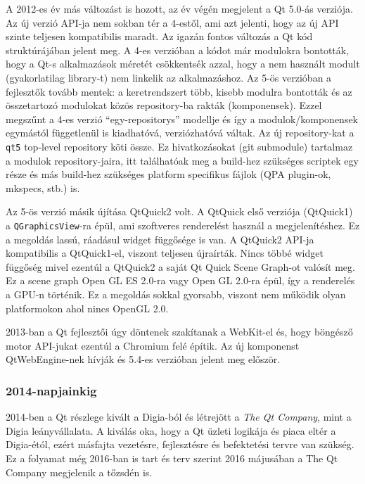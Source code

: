 \documentclass[12pt]{report}
\begin{document}
A 2012-es év más változást is hozott, az év végén megjelent a Qt 5.0-ás verziója.
Az új verzió API-ja nem sokban tér a 4-estől, ami azt jelenti, hogy az új API szinte
teljesen kompatibilis maradt. Az igazán fontos változás a Qt kód struktúrájában jelent meg.
A 4-es verzióban a kódot már modulokra bontották, hogy a Qt-s alkalmazások méretét
csökkentsék azzal, hogy a nem használt modult (gyakorlatilag library-t) nem linkelik
az alkalmazáshoz. Az 5-ös verzióban a fejlesztők tovább mentek: a keretrendszert több,
kisebb modulra bontották és az összetartozó modulokat közös repository-ba rakták
(komponensek). Ezzel megszűnt a 4-es verzió ``egy-repositorys'' modellje és így a
modulok/komponensek egymástól függetlenül is kiadhatóvá, verziózhatóvá váltak.
Az új repository-kat a \texttt{qt5} top-level repository köti össze.
Ez hivatkozásokat (git submodule) tartalmaz a modulok repository-jaira, itt találhatóak meg a
build-hez szükséges scriptek egy része és más build-hez szükséges platform specifikus fájlok
(QPA plugin-ok, mkspecs, stb.) is.

Az 5-ös verzió másik újítása QtQuick2 volt. A QtQuick első verziója (QtQuick1) a
\texttt{QGraphicsView}-ra épül, ami szoftveres renderelést használ a megjelenítéshez.
Ez a megoldás lassú, ráadásul widget függősége is van. A QtQuick2 API-ja kompatibilis a
QtQuick1-el, viszont teljesen újraírták. Nincs többé widget függőség mivel ezentúl a
QtQuick2 a saját Qt Quick Scene Graph-ot valósít meg. Ez a scene graph Open GL ES 2.0-ra vagy
Open GL 2.0-ra épül, így a renderelés a GPU-n történik. Ez a megoldás sokkal gyorsabb,
viszont nem működik olyan platformokon ahol nincs OpenGL 2.0.

2013-ban a Qt fejlesztői úgy döntenek szakítanak a WebKit-el és, hogy böngésző motor
API-jukat ezentúl a Chromium felé építik. \cite{bib:qt-blog-introducing-qtwebengine}
Az új komponenst QtWebEngine-nek hívják és 5.4-es verzióban jelent meg először.
\cite{bib:qt-wiki-qt-history}

\subsubsection{2014-napjainkig}
2014-ben a Qt részlege kivált a Digia-ból és létrejött a \textit{The Qt Company},
mint a Digia leányvállalata. A kiválás oka, hogy a Qt üzleti logikája és piaca eltér a
Digia-étól, ezért másfajta vezetésre, fejlesztésre és befektetési tervre van szükség.
Ez a folyamat még 2016-ban is tart és terv szerint 2016 májusában a The Qt Company megjelenik
a tőzsdén is.
\cite{bib:qt-about-us}
\end{document}
